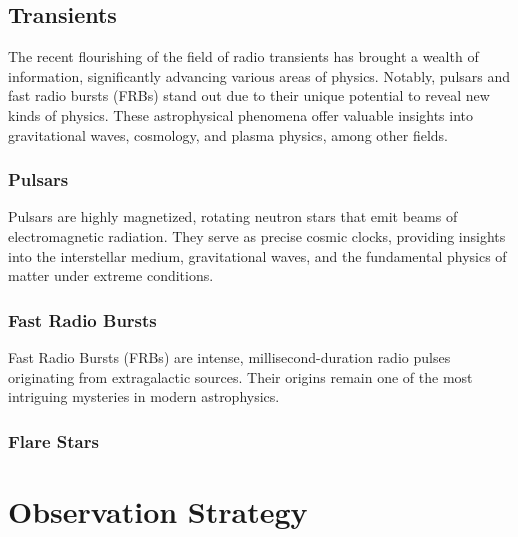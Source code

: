 \subsection{Transients}
The recent flourishing of the field of radio transients has brought a wealth of information, significantly advancing various areas of physics. Notably, pulsars and fast radio bursts (FRBs) stand out due to their unique potential to reveal new kinds of physics. These astrophysical phenomena offer valuable insights into gravitational waves, cosmology, and plasma physics, among other fields.

\subsubsection{Pulsars}
Pulsars are highly magnetized, rotating neutron stars that emit beams of electromagnetic radiation. They serve as precise cosmic clocks, providing insights into the interstellar medium, gravitational waves, and the fundamental physics of matter under extreme conditions. %

\subsubsection{Fast Radio Bursts}
Fast Radio Bursts (FRBs) are intense, millisecond-duration radio pulses originating from extragalactic sources. Their origins remain one of the most intriguing mysteries in modern astrophysics. %

\subsubsection{Flare Stars}


\section{Observation Strategy} %

